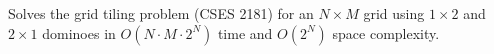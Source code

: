 
Solves the grid tiling problem (CSES 2181) for an $N \times M$ grid using $1 \times 2$ and $2 \times 1$ dominoes in $O(N \cdot M \cdot 2^N)$ time and $O(2^N)$ space complexity.



